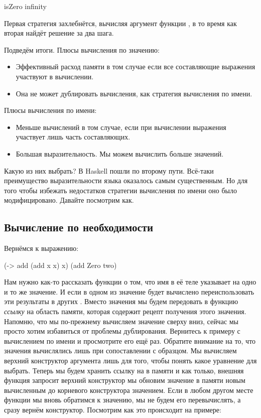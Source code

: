 \begin{code}
isZero infinity
\end{code}

Первая стратегия захлебнётся, вычисляя аргумент функции ,
в то время как вторая найдёт решение за два шага. 

Подведём итоги. Плюсы вычисления по значению:

\begin{itemize}
\item Эффективный расход памяти в том случае если все 
        составляющие выражения участвуют в вычислении.

\item Она не может дублировать вычисления, как стратегия
        вычисления по имени.
\end{itemize}

Плюсы вычисления по имени:

\begin{itemize}
\item Меньше вычислений в том случае, если при вычислении выражения
    участвует лишь часть составляющих.

\item Большая выразительность. Мы можем вычислить больше значений.
\end{itemize}

Какую из них выбрать? В Haskell пошли по второму пути. Всё-таки
преимущество выразительности языка оказалось самым существенным.
Но для того чтобы избежать недостатков стратегии вычисления по имени
оно было модифицировано. Давайте посмотрим как.

\subsection{Вычисление по необходимости}

Вернёмся к выражению: 

\begin{code}
(\x -> add (add x x) x) (add Zero two)
\end{code}

Нам нужно как-то рассказать функции о том, что имя 
в её теле указывает на одно и то же значение. И если
в одном из  значение будет вычислено переиспользовать
эти результаты в других . Вместо значения мы будем
передовать в функцию \emph{ссылку} на область памяти,
которая содержит рецепт получения этого значения. 
Напомню, что мы по-прежнему вычисляем значение сверху вниз,
сейчас мы просто хотим избавиться от проблемы дублирования.
Вернитесь к примеру с вычислением по имени и просмотрите его
ещё раз. Обратите внимание на то, что значения вычислялись
лишь при сопоставлении с образцом. 
Мы вычисляем верхний конструктор аргумента лишь для того,
чтобы понять какое уравнение для  выбрать. 
Теперь мы будем хранить ссылку на 
в памяти и как только, внешняя функция запросит
верхний конструктор мы обновим значение в памяти новым
вычисленным до корневого конструктора значением.
Если в любом другом месте функции мы вновь обратимся 
к значению, мы не будем его перевычислять, а сразу 
вернём конструктор. Посмотрим как это происходит на примере:

